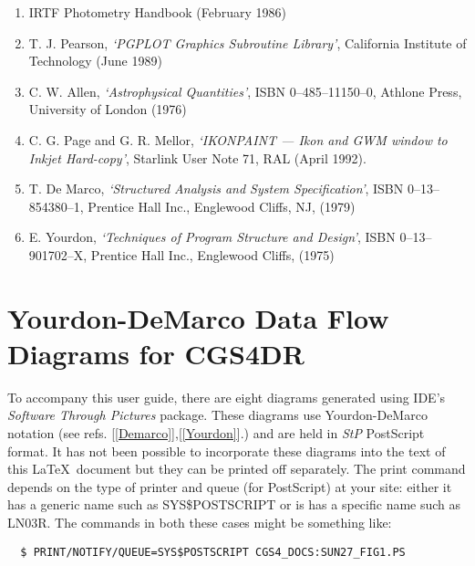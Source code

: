 {\begin{enumerate}
      D. E. Blackwell and A. D. Petford, 
     {\em `Measurement of the Absolute Flux from Vega at 4.92 $\mu$m'},
     Astronomy \& Astrophysics {\bf 151}, Number 2, p339--402 
     (October, 1985).                                      \label{Mountain_2}
\item IRTF Photometry Handbook (February 1986)             \label{IRTF}
\item T. J. Pearson,
     {\em `PGPLOT Graphics Subroutine Library'},
      California Institute of Technology (June 1989)       \label{Pearson}
\item C. W. Allen,
     {\em `Astrophysical Quantities'}, ISBN 0--485--11150--0, 
      Athlone Press, University of London (1976)           \label{Allen}
\item C. G. Page and G. R. Mellor,
     {\em `IKONPAINT --- Ikon and GWM window to Inkjet Hard-copy'},
      Starlink User Note 71, RAL (April 1992).             \label{Page}
\item T. De Marco,
     {\em `Structured Analysis and System Specification'},
      ISBN 0--13--854380--1,
      Prentice Hall Inc., Englewood Cliffs, NJ, (1979)     \label{Demarco}
\item E. Yourdon,
     {\em `Techniques of Program Structure and Design'},
      ISBN 0--13--901702--X,
      Prentice Hall Inc., Englewood Cliffs, (1975)         \label{Yourdon}
\end{enumerate}

\appendix
\newpage
\markright{\stardocname}
\section{Yourdon-DeMarco Data Flow Diagrams for CGS4DR}
\label{figures}

To accompany this user guide, there are eight diagrams generated using
IDE's {\sl Software Through Pictures} package. These diagrams use
Yourdon-DeMarco notation (see refs. [\ref{Demarco}],[\ref{Yourdon}].) 
and are held in {\sl StP} PostScript format. It has not been possible to
incorporate these diagrams into the text of this \LaTeX\ document but they
can be printed off separately. The print command depends on the type of
printer and queue (for PostScript) at your site: either it has a generic
name such as SYS\$POSTSCRIPT or is has a specific name such as LN03R. The
commands in both these cases might be something like:

\begin{verbatim}
  $ PRINT/NOTIFY/QUEUE=SYS$POSTSCRIPT CGS4_DOCS:SUN27_FIG1.PS
\end{verbatim}

}
